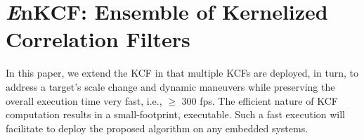\documentclass{bmvc2k}
\begin{document}
\begin{itemize}

\end{itemize}

\section{{\it E}nKCF: Ensemble of Kernelized Correlation Filters}
In this paper, we extend the KCF in that multiple KCFs are deployed,
in turn, to address a target's scale change and dynamic maneuvers
while preserving the overall execution time very fast, i.e., $\ge$ 300
fps. The efficient nature of KCF computation results in a
small-footprint, executable. Such a fast execution will facilitate to
deploy the proposed algorithm on any embedded systems.
\end{document}
